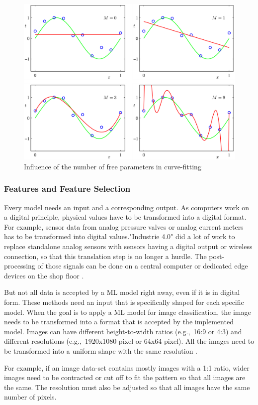 \begin{figure}[H]
	\centering
	\includegraphics[width=0.8\linewidth]{IMGs/poly.png}
	\caption{Influence of the number of free parameters in curve-fitting \cite{Bishop}}
	\label{fig:poly}
\end{figure}

\subsubsection*{Features and Feature Selection}
Every model needs an input and a corresponding output. As computers work on a digital principle, physical values have to be transformed into a digital format. For example, sensor data from analog pressure valves or analog current meters has to be transformed into digital values.\newline "Industrie 4.0" did a lot of work to replace standalone analog sensors with sensors having a digital output or wireless connection, so that this translation step is no longer a hurdle. The post-processing of those signals can be done on a central computer or dedicated edge devices on the shop floor \cite{Lu}.

But not all data is accepted by a ML model right away, even if it is in digital form. These methods need an input that is specifically shaped for each specific model.
When the goal is to apply a ML model for image classification, the image needs to be transformed into a format that is accepted by the implemented model. Images can have different height-to-width ratios (e.g.,~16:9 or 4:3) and different resolutions (e.g.,~1920x1080 pixel or 64x64 pixel). All the images need to be transformed into a uniform shape with the same resolution \cite{Park}.

For example, if an image data-set contains mostly images with a 1:1 ratio, wider images need to be contracted or cut off to fit the pattern so that all images are the same. The resolution must also be adjusted so that all images have the same number of pixels.

